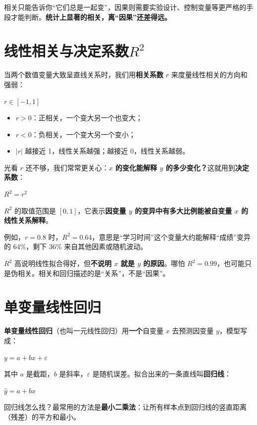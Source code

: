 \documentclass[lang=cn,10pt]{elegantbook}
\begin{document}
\begin{remark}
相关只能告诉你“它们总是一起变”，因果则需要实验设计、控制变量等更严格的手段才能判断。\textbf{统计上显著的相关，离“因果”还差得远。}
\end{remark}

\section{线性相关与决定系数$R^2$}
当两个数值变量大致呈直线关系时，我们用\textbf{相关系数} $r$ 来度量线性相关的方向和强弱：
\begin{center}
$r\in[-1,1]$
\end{center}
\begin{itemize}
  \item $r>0$：正相关，一个变大另一个也变大；
  \item $r<0$：负相关，一个变大另一个变小；
  \item $|r|$ 越接近 1，线性关系越强；越接近 0，线性关系越弱。
\end{itemize}

光看 $r$ 还不够，我们常常更关心：\textbf{$x$ 的变化能解释 $y$ 的多少变化？}这就用到\textbf{决定系数}：
\begin{center}
$R^2=r^2$
\end{center}
$R^2$ 的取值范围是 $[0,1]$，它表示\textbf{因变量 $y$ 的变异中有多大比例能被自变量 $x$ 的线性关系解释}。

例如，$r=0.8$ 时，$R^2=0.64$，意思是“学习时间”这个变量大约能解释“成绩”变异的 64\%，剩下 36\% 来自其他因素或随机波动。

\begin{remark}
$R^2$ 高说明线性拟合得好，但\textbf{不说明 $x$ 就是 $y$ 的原因}。哪怕 $R^2=0.99$，也可能只是伪相关。相关和回归描述的是“关系”，不是“因果”。
\end{remark}

\section{单变量线性回归}
\textbf{单变量线性回归}（也叫一元线性回归）用\textbf{一个}自变量 $x$ 去预测因变量 $y$，模型写成：
\begin{center}
$y=a+bx+\varepsilon$
\end{center}
其中 $a$ 是截距，$b$ 是斜率，$\varepsilon$ 是随机误差。拟合出来的一条直线叫\textbf{回归线}：
\begin{center}
$\hat{y}=a+bx$
\end{center}

回归线怎么找？最常用的方法是\textbf{最小二乘法}：让所有样本点到回归线的竖直距离（残差）的平方和最小。
\end{document}
